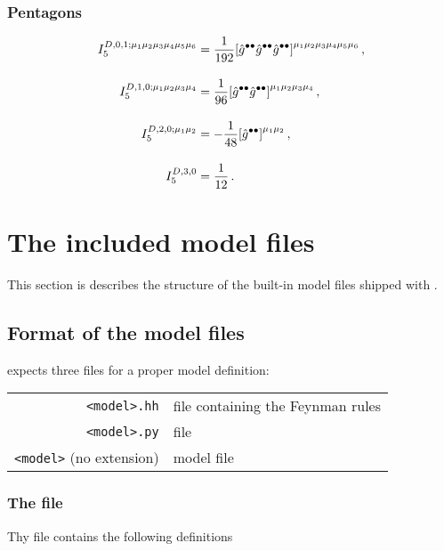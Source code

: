 \subsection*{Pentagons}
\begin{subequations}
\begin{align}
  I_5^{D,0,1;\mu_1\mu_2\mu_3\mu_4\mu_5\mu_6} &= \frac{1}{192}\qty[\hat{g}^{\bullet\bullet}\hat{g}^{\bullet\bullet}\hat{g}^{\bullet\bullet}]^{\mu_1\mu_2\mu_3\mu_4\mu_5\mu_6}\,,\\[10pt]
%
  I_5^{D,1,0;\mu_1\mu_2\mu_3\mu_4} &= \frac{1}{96}\qty[\hat{g}^{\bullet\bullet}\hat{g}^{\bullet\bullet}]^{\mu_1\mu_2\mu_3\mu_4}\,,\\[10pt]
%
  I_5^{D,2,0;\mu_1\mu_2} &= -\frac{1}{48}\qty[\hat{g}^{\bullet\bullet}]^{\mu_1\mu_2}\,,\\[10pt]
%
  I_5^{D,3,0} &= \frac{1}{12}\,.
\end{align}
\end{subequations}

\chapter{The included model files}
\label{chp:model-files}
This section is describes the structure of the built-in model files shipped with \gosam.

\section{Format of the model files}\label{sec:modelfiles}
\gosamv{} expects three files for a proper model definition:

\begin{tabular}{r l}
\texttt{<model>.hh} & \form{} file containing the Feynman rules \\
\texttt{<model>.py} & \python{} file \\
\texttt{<model>} (no extension) & \qgraf{} model file \\
\end{tabular}

\subsection{The \python{} file}
Thy \python{} file contains the following definitions

